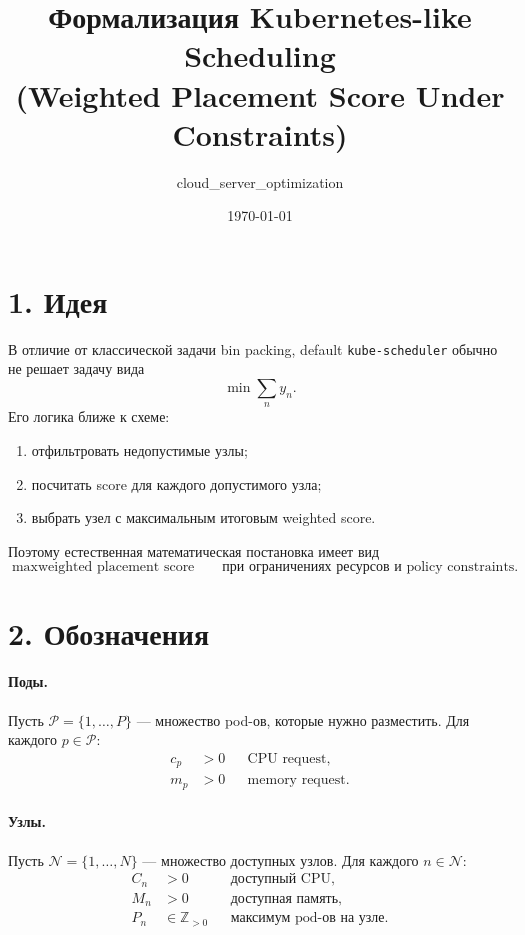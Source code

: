 \documentclass[11pt]{article}
\title{Формализация Kubernetes-like Scheduling\\(Weighted Placement Score Under Constraints)}
\author{cloud\_server\_optimization}
\date{\today}
\begin{document}
\maketitle

\section*{1. Идея}

В отличие от классической задачи bin packing, default \texttt{kube-scheduler}
обычно не решает задачу вида
\[
  \min \sum_n y_n.
\]
Его логика ближе к схеме:
\begin{enumerate}
  \item отфильтровать недопустимые узлы;
  \item посчитать score для каждого допустимого узла;
  \item выбрать узел с максимальным итоговым weighted score.
\end{enumerate}

Поэтому естественная математическая постановка имеет вид
\[
  \max \text{weighted placement score}
  \qquad \text{при ограничениях ресурсов и policy constraints.}
\]

\section*{2. Обозначения}

\paragraph{Поды.}
Пусть \(\mathcal{P}=\{1,\dots,P\}\) --- множество pod-ов, которые нужно разместить.
Для каждого \(p\in\mathcal{P}\):
\begin{align*}
  c_p &> 0 && \text{CPU request,}\\
  m_p &> 0 && \text{memory request.}
\end{align*}

\paragraph{Узлы.}
Пусть \(\mathcal{N}=\{1,\dots,N\}\) --- множество доступных узлов.
Для каждого \(n\in\mathcal{N}\):
\begin{align*}
  C_n &> 0 && \text{доступный CPU,}\\
  M_n &> 0 && \text{доступная память,}\\
  P_n &\in \mathbb{Z}_{>0} && \text{максимум pod-ов на узле.}
\end{align*}
\end{document}
